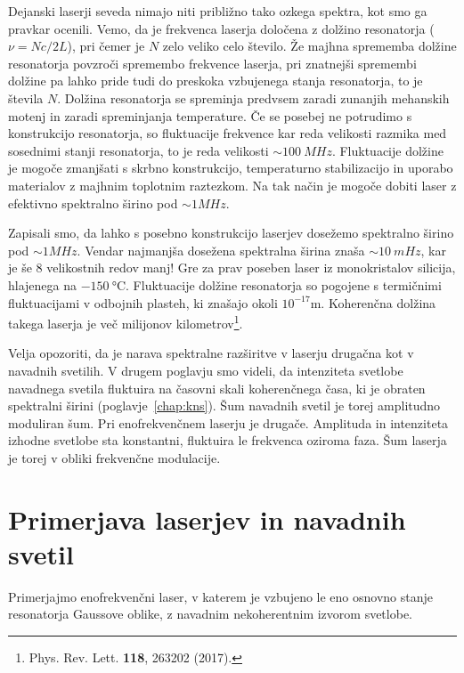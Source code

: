 Dejanski laserji seveda nimajo niti približno tako ozkega spektra, kot smo ga
pravkar ocenili. Vemo, da je frekvenca laserja določena z dolžino resonatorja 
($\nu=N c/2L$), pri čemer je $N$ zelo veliko celo število. Že majhna
sprememba dolžine resonatorja povzroči spremembo frekvence laserja, pri 
znatnejši spremembi dolžine pa lahko pride tudi do preskoka vzbujenega
stanja resonatorja, to je števila $N$. Dolžina resonatorja se 
spreminja predvsem zaradi zunanjih mehanskih motenj in zaradi spreminjanja
temperature. Če se posebej ne potrudimo s konstrukcijo resonatorja, so 
fluktuacije frekvence kar reda velikosti razmika med sosednimi stanji 
resonatorja, to je reda velikosti $\sim 100~\si{MHz}$. 
Fluktuacije dolžine je mogoče zmanjšati s skrbno konstrukcijo, 
temperaturno stabilizacijo in uporabo materialov z majhnim toplotnim raztezkom. 
Na tak način je mogoče dobiti laser z efektivno spektralno širino pod $\sim 1\si{MHz}$.

\begin{remark}
Zapisali smo, da lahko s posebno konstrukcijo laserjev dosežemo
spektralno širino pod $\sim 1\si{MHz}$. Vendar najmanjša dosežena spektralna širina
znaša $\sim 10~\si{mHz}$, kar je še 8 velikostnih redov manj! Gre za prav poseben 
laser iz monokristalov silicija, hlajenega na $-150~\si{\celsius}$. Fluktuacije
dolžine resonatorja so pogojene s termičnimi fluktuacijami v odbojnih plasteh, 
ki znašajo okoli $10^{-17}\si{\metre}$. Koherenčna dolžina takega laserja je več
milijonov kilometrov\footnote{Phys. Rev. Lett. {\bf 118}, 263202 (2017).}. 
\end{remark}

Velja opozoriti, da je narava spektralne razširitve v laserju 
drugačna kot v navadnih svetilih. V drugem poglavju smo videli, da 
intenziteta svetlobe navadnega svetila fluktuira na časovni skali 
koherenčnega časa, ki je obraten spektralni širini (poglavje~\ref{chap:kns}). 
Šum navadnih svetil je torej amplitudno moduliran šum. Pri 
enofrekvenčnem laserju je drugače. Amplituda in intenziteta 
izhodne svetlobe sta konstantni, fluktuira le frekvenca oziroma
faza. Šum laserja je torej v obliki frekvenčne modulacije.

\section{Primerjava laserjev in navadnih svetil}
Primerjajmo enofrekvenčni laser, v katerem je vzbujeno le eno osnovno
stanje resonatorja Gaussove oblike, z navadnim nekoherentnim izvorom svetlobe.

